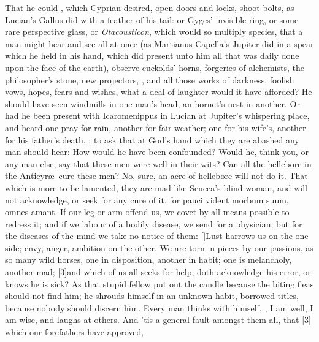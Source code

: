 {That he could , which Cyprian desired, open doors and locks, shoot
bolts, as Lucian's Gallus did with a feather of his tail: or Gyges'
invisible ring, or some rare perspective glass, or \emph{Otacousticon},
which would so multiply species, that a man might hear and see all at
once (as  Martianus Capella's Jupiter did in a spear which he held
in his hand, which did present unto him all that was daily done upon
the face of the earth), observe cuckolds' horns, forgeries of
alchemists, the philosopher's stone, new projectors, \etc{}, and all those
works of darkness, foolish vows, hopes, fears and wishes, what a deal
of laughter would it have afforded? He should have seen windmills in
one man's head, an hornet's nest in another. Or had he been present
with Icaromenippus in Lucian at Jupiter's whispering place, and
heard one pray for rain, another for fair weather; one for his wife's,
another for his father's death, \etc{}; to ask that at God's hand which
they are abashed any man should hear: How would he have been
confounded? Would he, think you, or any man else, say that these men
were well in their wits?  Can all the hellebore in the Anticyr\ae{}\ cure these men? No,
sure, an acre of hellebore will not do it.
That which is more to be lamented, they are mad like Seneca's blind
woman, and will not acknowledge, or seek for any cure of it, for
pauci vident morbum suum, omnes amant. If our leg or arm offend us, we
covet by all means possible to redress it; and if we labour of a
bodily disease, we send for a physician; but for the diseases of the
mind we take no notice of them: [\baselineskip]Lust harrows us on the one side;
envy, anger, ambition on the other. We are torn in pieces by our
passions, as so many wild horses, one in disposition, another in habit;
one is melancholy, another mad; [3\baselineskip]and which of us all seeks for
help, doth acknowledge his error, or knows he is sick? As that stupid
fellow put out the candle because the biting fleas should not find him;
he shrouds himself in an unknown habit, borrowed titles, because nobody
should discern him. Every man thinks with himself, , I am well, I am wise, and laughs at others. And 'tis a general
fault amongst them all, that [3\baselineskip] which our forefathers have approved,
}
